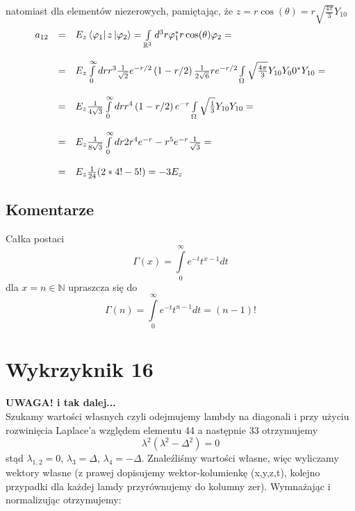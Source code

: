 \documentclass[a4paper,12pt]{article}
\begin{document}
	natomiast dla elementów niezerowych, pamiętając, że $z = r\cos(\theta) = r\sqrt{\frac{4\pi}{3}}Y_{10}$
		$$
		\begin{array}{lll}
			a_{12} &=& E_z \bra{\varphi_1}z\ket{\varphi_2} = \int\limits_{\mathbb{R}^3}d^3r\varphi_1^*r\cos(\theta)\varphi_2 = \\\\
				   &=& E_z \int\limits_0^\infty dr r^3 \frac{1}{\sqrt{2}}e^{-r/2}\left(1-r/2\right)
				   \frac{1}{2\sqrt{6}}re^{-r/2}\int\limits_{\Omega}\sqrt{\frac{4\pi}{3}}Y_{10}Y_00^*Y_{10} = \\\\
				   &=& E_z \frac{1}{4\sqrt{3}}\int\limits_0^\infty dr r^4\left(1-r/2\right)e^{-r} \int\limits_{\Omega}\sqrt{\frac{1}{3}}Y_{10}Y_{10} =\\\\
				   &=& E_z \frac{1}{8\sqrt{3}}\int\limits_0^\infty dr 2r^4e^{-r}-r^5e^{-r} \frac{1}{\sqrt{3}} = \\\\
				   &=& E_z \frac{1}{24}(2*4!-5!) = -3 E_z
		\end{array}
		$$
		
\subsection{Komentarze}
	Całka postaci 
	$$
		\Gamma(x) = \int\limits_0^\infty e^{-t}t^{x-1}dt 
	$$
	dla $x=n\in\mathbb{N}$ upraszcza się do
	$$
		\Gamma(n) = \int\limits_0^\infty e^{-t}t^{n-1}dt =(n-1)!
	$$

\section{Wykrzyknik 16}
\textbf{UWAGA! i tak dalej...}\\
Szukamy wartości własnych czyli odejmujemy lambdy na diagonali i przy użyciu
rozwinięcia Laplace'a względem elementu 44 a następnie 33 otrzymujemy
\begin{equation*}
  \lambda^2 \left( \lambda^2 - \Delta^2 \right) = 0
\end{equation*}
stąd $\lambda_{1,2} = 0$, $\lambda_3 = \Delta$, $\lambda_4 = -\Delta$.
Znaleźliśmy wartości własne, więc wyliczamy wektory własne (z prawej dopisujemy
wektor-kolumienkę (x,y,z,t), kolejno przypadki dla każdej lamdy przyrównujemy do
kolumny zer). Wymnażając i normalizując otrzymujemy:
\end{document}
